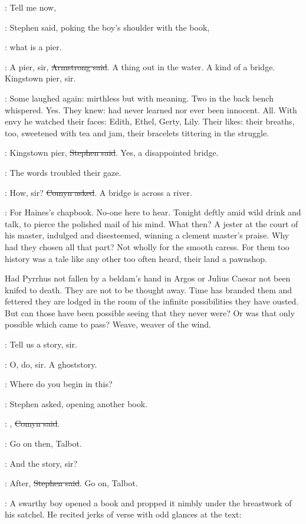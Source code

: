 \Stephen:
Tell me now,

:
Stephen said, poking the boy's shoulder with the book,

\Stephen:
what is a pier.

\armstrong:
A pier, sir, \sout{Armstrong said}.
A thing out in the water.
A kind of a bridge.
Kingstown pier, sir.


:
Some laughed again: mirthless but with meaning.
Two in the back bench whispered.
Yes.
They knew: had never learned nor ever been innocent.
All.
With envy he watched their faces: Edith, Ethel, Gerty, Lily.
Their likes: their breaths, too,
sweetened with tea and jam,
their bracelets tittering in the struggle.

\Stephen:
Kingstown pier, \sout{Stephen said}.
Yes, a disappointed bridge.

:
The words troubled their gaze.

\comyn:
How, sir?
\sout{Comyn asked}.
A bridge is across a river.

\StephenInt:
For Haines's chapbook.
No-one here to hear.
Tonight deftly amid wild drink and talk,
to pierce the polished mail of his mind.
What then?
A jester at the court of his master, 
indulged and disesteemed,
winning a clement master's praise.
Why had they chosen all that part?
Not wholly for the smooth caress.
For them too history was a tale like any other too often heard,
their land a pawnshop.

Had Pyrrhus not fallen by a beldam's hand in Argos
or Julius Caesar not been knifed to death.
They are not to be thought away.
Time has branded them
and fettered they are lodged in the room of the infinite possibilities
they have ousted.
But can those have been possible
seeing that they never were?
Or was that only possible which came to pass?
Weave, weaver of the wind.

\All:
Tell us a story, sir.

\All:
O, do, sir. A ghoststory.

\Stephen:
Where do you begin in this?

:
Stephen asked, opening another book.

\comyn:
, \sout{Comyn said}.

\Stephen:
Go on then, Talbot.

\talbot:
And the story, sir?

\Stephen:
After, \sout{Stephen said}.
Go on, Talbot.

:
A swarthy boy opened a book
and propped it nimbly under the breastwork of his satchel.
He recited jerks of verse with odd glances at the text:

